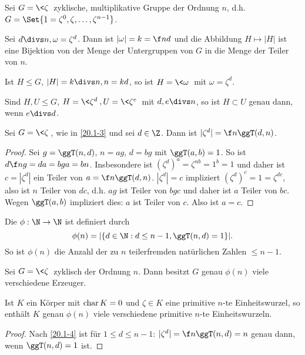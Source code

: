 \begin{nt} \label{20.1-3}
	Sei $G = \<\zeta\>$ zyklische, multiplikative Gruppe der Ordnung $n$, d.h. $G = \Set{ 1 = \zeta^0, \zeta, \dotsc, \zeta^{n-1} }$.

	Sei $d \divs n, \omega = \zeta^d$.
	Dann ist $|\omega| = k = \f nd$ und die Abbildung $H \mapsto |H|$ ist eine Bijektion von der Menge der Untergruppen von $G$ in die Menge der Teiler von $n$.

	Ist $H \le G$, $|H| = k \divs n, n = kd$, so ist $H = \<\omega\>$ mit $\omega = \zeta^d$.

	Sind $H, U \le G$, $H = \<\zeta^d\>, U = \<\zeta^e\>$ mit $d,e \divs n$, so ist $H \subset U$ genau dann, wenn $e \divs d$.
\end{nt}



\begin{lem} \label{20.1-4}
	Sei $G = \<\zeta\>$, wie in \ref{20.1-3} und sei $d \in \Z$.
	Dann ist $|\zeta^d| = \f n{\ggT(d,n)}$.
	\begin{proof}
		Sei $g = \ggT(n, d)$, $n = ag$, $d = bg$ mit $\ggT(a,b) = 1$.
		So ist $d \f ng = da = bg a = bn$.
		Insbesondere ist $(\zeta^d)^a = \zeta^{nb} = 1^b = 1$ und daher ist $c = |\zeta^d|$ ein Teiler von $a = \f n{\ggT(d,n)}$.
		$|\zeta^d| = c$ impliziert $(\zeta^d)^c = 1 = \zeta^{dc}$, also ist $n$ Teiler von $dc$,
		d.h. $ag$ ist Teiler von $bgc$ und daher ist $a$ Teiler von $bc$.
		Wegen $\ggT(a,b)$ impliziert dies: $a$ ist Teiler von $c$.
		Also ist $a = c$.
	\end{proof}
\end{lem}

\begin{df} \label{20.1-5}
	Die  $\phi: \N \to \N$ ist definiert durch
	\[
		\phi(n) = | \{d \in \N : d \le n-1, \ggT(n,d) = 1 \} |.
	\]
	So ist $\phi(n)$ die Anzahl der zu $n$ teilerfremden natürlichen Zahlen $\le n -1$.
\end{df}

\begin{kor} \label{20.1-6}
	Sei $G = \<\zeta\>$ zyklisch der Ordnung $n$.
	Dann besitzt $G$ genau $\phi(n)$ viele verschiedene Erzeuger.

	Ist $K$ ein Körper mit $\operatorname{char} K = 0$ und $\zeta \in K$ eine primitive $n$-te Einheitswurzel, so enthält $K$ genau $\phi(n)$ viele verschiedene primitive $n$-te Einheitswurzeln.
	\begin{proof}
		Nach \ref{20.1-4} ist für $1 \le d \le n-1$: $|\zeta^d| = \f n{\ggT(n,d)} = n$ genau dann, wenn $\ggT(n,d) = 1$ ist.
	\end{proof}
\end{kor}

